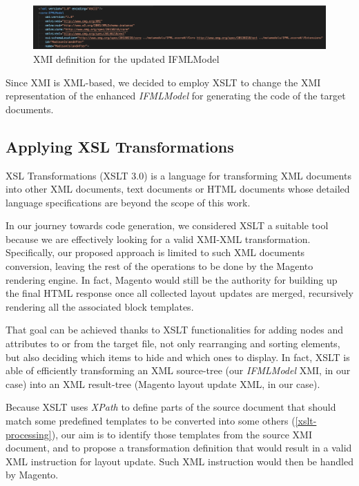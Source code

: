 \vspace{0.5cm}
\begin{figure}[H]
  \centering
    \includegraphics[width=15cm]{images/xmi-header.png}
  \caption{XMI definition for the updated IFMLModel}
  \label{fig:xmi-header}
\end{figure}
\vspace{0.5cm}


Since XMI is XML-based, we decided to employ XSLT to change the XMI representation of the enhanced \textit{IFMLModel} for generating the code of the target documents. 

\subsection{Applying XSL Transformations}

XSL Transformations (XSLT 3.0) is a language for transforming XML documents into other XML documents, text documents or HTML documents\cite{xslt} whose detailed language specifications are beyond the scope of this work.

In our journey towards code generation, we considered XSLT a suitable tool because we are effectively looking for a valid XMI-XML transformation. Specifically, our proposed approach is limited to such XML documents conversion, leaving the rest of the operations to be done by the Magento rendering engine. In fact, Magento would still be the authority for building up the final HTML response once all collected layout updates are merged, recursively rendering all the associated block templates.

That goal can be achieved thanks to XSLT functionalities for adding nodes and attributes to or from the target file, not only rearranging and sorting elements, but also deciding which items to hide and which ones to display. In fact, XSLT is able of efficiently transforming an XML source-tree (our \textit{IFMLModel} XMI, in our case) into an XML result-tree (Magento layout update XML, in our case).

Because XSLT uses \textit{XPath} to define parts of the source document that should match some predefined templates to be converted into some others (\ref{xslt-processing}), our aim is to identify those templates from the source XMI document, and to propose a  transformation definition that would result in a valid XML instruction for layout update. Such XML instruction would then be handled by Magento.

